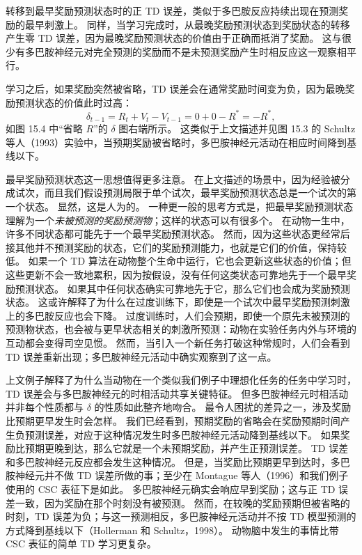 \documentclass[UTF8,12pt,a4paper,fontset=fandol]{ctexart}
\begin{document}
转移到最早奖励预测状态时的正 TD 误差，类似于多巴胺反应持续出现在预测奖励的最早刺激上。
同样，当学习完成时，从最晚奖励预测状态到奖励状态的转移产生零 TD 误差，因为最晚奖励预测状态的价值由于正确而抵消了奖励。
这与很少有多巴胺神经元对完全预测的奖励而不是未预测奖励产生时相反应这一观察相平行。

学习之后，如果奖励突然被省略，TD 误差会在通常奖励时间变为负，因为最晚奖励预测状态的价值此时过高：
\[
\delta_{t-1}=R_t+V_t-V_{t-1}=0+0-R^*=-R^*,
\]
如图 15.4 中“省略 $R$”的 $\delta$ 图右端所示。
这类似于上文描述并见图 15.3 的 Schultz 等人（1993）实验中，当预期奖励被省略时，多巴胺神经元活动在相应时间降到基线以下。

最早奖励预测状态这一思想值得更多注意。
在上文描述的场景中，因为经验被分成试次，而且我们假设预测局限于单个试次，最早奖励预测状态总是一个试次的第一个状态。
显然，这是人为的。
一种更一般的思考方式是，把最早奖励预测状态理解为一个\textit{未被预测的奖励预测物}；这样的状态可以有很多个。
在动物一生中，许多不同状态都可能先于一个最早奖励预测状态。
然而，因为这些状态更经常后接其他并不预测奖励的状态，它们的奖励预测能力，也就是它们的价值，保持较低。
如果一个 TD 算法在动物整个生命中运行，它也会更新这些状态的价值；但这些更新不会一致地累积，因为按假设，没有任何这类状态可靠地先于一个最早奖励预测状态。
如果其中任何状态确实可靠地先于它，那么它们也会成为奖励预测状态。
这或许解释了为什么在过度训练下，即使是一个试次中最早奖励预测刺激上的多巴胺反应也会下降。
过度训练时，人们会预期，即使一个原先未被预测的预测物状态，也会被与更早状态相关的刺激所预测：动物在实验任务内外与环境的互动都会变得司空见惯。
然而，当引入一个新任务打破这种常规时，人们会看到 TD 误差重新出现；多巴胺神经元活动中确实观察到了这一点。

上文例子解释了为什么当动物在一个类似我们例子中理想化任务的任务中学习时，TD 误差会与多巴胺神经元的时相活动共享关键特征。
但多巴胺神经元时相活动并非每个性质都与 $\delta$ 的性质如此整齐地吻合。
最令人困扰的差异之一，涉及奖励比预期更早发生时会怎样。
我们已经看到，预期奖励的省略会在奖励预期时间产生负预测误差，对应于这种情况发生时多巴胺神经元活动降到基线以下。
如果奖励比预期更晚到达，那么它就是一个未预期奖励，并产生正预测误差。
TD 误差和多巴胺神经元反应都会发生这种情况。
但是，当奖励比预期更早到达时，多巴胺神经元并不做 TD 误差所做的事；至少在 Montague 等人（1996）和我们例子使用的 CSC 表征下是如此。
多巴胺神经元确实会响应早到奖励；这与正 TD 误差一致，因为奖励在那个时刻没有被预测。
然而，在较晚的奖励预期但被省略的时刻，TD 误差为负；与这一预测相反，多巴胺神经元活动并不按 TD 模型预测的方式降到基线以下（Hollerman 和 Schultz，1998）。
动物脑中发生的事情比带 CSC 表征的简单 TD 学习更复杂。
\end{document}
